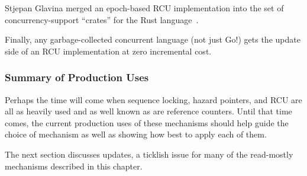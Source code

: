 Stjepan Glavina merged an epoch-based RCU implementation into the
 set of concurrency-support ``crates'' for the Rust
language~\cite{StjepanGlavina2018RustRCU}.

Finally, any garbage-collected concurrent language (not just Go!) gets
the update side of an RCU implementation at zero incremental cost.

\subsubsection{Summary of Production Uses}
\label{sec:defer:Summary of Production Uses}

Perhaps the time will come when sequence locking, hazard pointers, and
RCU are all as heavily used and as well known as are reference counters.
Until that time comes, the current production uses of these mechanisms
should help guide the choice of mechanism as well as showing how best
to apply each of them.

The next section discusses updates, a ticklish issue for many of the
read-mostly mechanisms described in this chapter.
